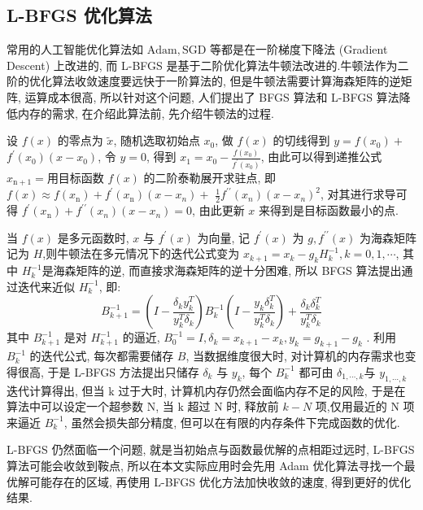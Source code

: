\documentclass{Sichuan Normal University}
\begin{document}
\subsection{L-BFGS 优化算法}
常用的人工智能优化算法如 $\mathrm{Adam}, \mathrm{SGD}$ 等都是在一阶梯度下降法 (Gradient Descent) 上改进的, 而 L-BFGS 是基于二阶优化算法牛顿法改进的.牛顿法作为二阶的优化算法收敛速度要远快于一阶算法的, 
但是牛顿法需要计算海森矩阵的逆矩阵, 运算成本很高, 所以针对这个问题, 人们提出了 BFGS 算法和 L-BFGS 算法降低内存的需求, 在介绍此算法前, 先介绍牛顿法的过程.

设 $f(x)$ 的零点为 $\tilde{x}$, 随机选取初始点 $x_0$, 做 $f(x)$ 的切线得到 $y=f\left(x_0\right)+$ $f^{\prime}\left(x_0\right)\left(x-x_0\right)$, 令 $y=0$, 得到 $x_1=x_0-\frac{f\left(x_0\right)}{f^{\prime}\left(x_0\right)}$, 
由此可以得到递推公式 $x_{\mathrm{n}+1}=$用目标函数 $f(x)$ 的二阶泰勒展开求驻点, 即 $f(x) \approx f\left(x_{\mathrm{n}}\right)+f^{\prime}\left(x_{\mathrm{n}}\right)\left(x-x_n\right)+$ $\frac{1}{2} f^{\prime \prime}\left(x_n\right)\left(x-x_n\right)^2$, 
对其进行求导可得 $f^{\prime}\left(x_{\mathrm{n}}\right)+f^{\prime \prime}\left(x_n\right)\left(x-x_n\right)=0$, 由此更新 $x$ 来得到是目标函数最小的点.

当 $f(x)$ 是多元函数时, $x$ 与 $f^{\prime}(x)$ 为向量, 记 $f^{\prime}(x)$ 为 $g, f^{\prime \prime}(x)$ 为海森矩阵记为 $H$,则牛顿法在多元情况下的迭代公式变为 $x_{k+1}=x_k-g_k H_k^{-1}, k=0,1, \cdots$, 其中 $H_k^{-1}$是海森矩阵的逆, 
而直接求海森矩阵的逆十分困难, 所以 BFGS 算法提出通过迭代来近似 $H_k^{-1}$, 即:
\begin{equation}
    B_{k+1}^{-1}=\left(I-\frac{\delta_k y_k^T}{y_k^T \delta_k}\right) B_k^{-1}\left(I-\frac{y_k \delta_k^T}{y_k^T \delta_k}\right)+\frac{\delta_k \delta_k^T}{y_k^T \delta_k}
\label{eq:BFGS}
\end{equation}其中 $B_{k+1}^{-1}$ 是对 $H_{k+1}^{-1}$ 的逼近, $B_0^{-1}=I, \delta_k=x_{k+1}-x_k, y_k=g_{k+1}-g_k$ .
利用 $B_k^{-1}$ 的迭代公式, 每次都需要储存 $B$, 当数据维度很大时, 对计算机的内存需求也变得很高, 于是 L-BFGS 方法提出只储存 $\delta_k$ 与 $y_k$, 每个 $B_k^{-1}$ 都可由 $\delta_{1, \cdots, k}$与 $y_{1, \cdots, k}$ 迭代计算得出, 但当 $\mathrm{k}$ 过于大时, 计算机内存仍然会面临内存不足的风险, 于是在算法中可以设定一个超参数 $\mathrm{N}$, 当 $\mathrm{k}$ 超过 $\mathrm{N}$ 时, 释放前 $k-N$ 项,仅用最近的 $\mathrm{N}$ 项来逼近 $B_k^{-1}$, 虽然会损失部分精度, 但可以在有限的内存条件下完成函数的优化.

L-BFGS 仍然面临一个问题, 就是当初始点与函数最优解的点相距过远时, L-BFGS 算法可能会收敛到鞍点, 所以在本文实际应用时会先用 Adam 优化算法寻找一个最优解可能存在的区域, 再使用 L-BFGS 优化方法加快收敛的速度, 得到更好的优化结果.
\end{document}
